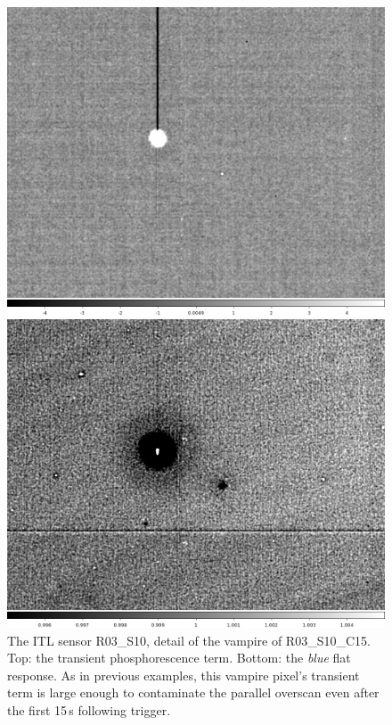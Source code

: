 \begin{figure}[!htbp]
\centering
\begin{minipage}{1.0\textwidth}    
  \centering
  \includegraphics[width=.6\linewidth]{figures/phosphorescence-survey/stains_phos_R03_S10.png}    
\end{minipage}
\begin{minipage}{1.0\textwidth}
  \centering
  \includegraphics[width=.6\linewidth]{figures/phosphorescence-survey/stains_abs_R03_S10.png}
\end{minipage}
\caption{The ITL sensor R03\_S10, detail of the vampire of R03\_S10\_C15. Top: the transient phosphorescence term. Bottom: the {\it blue} flat response. As in previous examples, this vampire pixel's transient term is large enough to contaminate the parallel overscan even after the first 15\,s following trigger.}
\label{fig:phos:stains:R03S10}
\end{figure}


